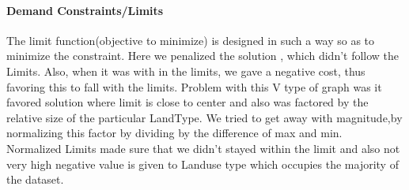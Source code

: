 \documentclass[12pt]{article} %
\begin{document}
\paragraph{Demand Constraints/Limits} The limit function(objective to minimize) is designed in such a way so as to minimize the constraint. Here we penalized the solution , which didn't follow the Limits. Also,  when it was with in the limits, we gave a negative cost, thus favoring this to fall with the limits. Problem with this V type of graph was it favored solution where limit is close to center and also was factored by the relative size of the particular LandType. We tried to get away with magnitude,by normalizing this factor by dividing by the difference of max and min.\\ Normalized Limits made sure that we didn't stayed within the limit and also not very high negative value is given to Landuse type which occupies the majority of the dataset.\\
\end{document}

